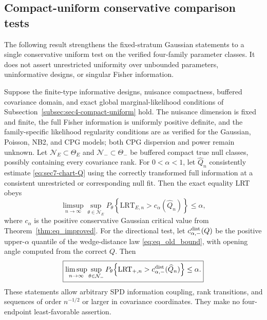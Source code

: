 \subsection{Compact-uniform conservative comparison tests}
\label{subsec:sec7-uniform-contrast}

The following result strengthens the fixed-stratum Gaussian
statements to a single conservative uniform test on the verified
four-family parameter classes. It does not assert unrestricted
uniformity over unbounded parameters, uninformative designs, or
singular Fisher information.

\begin{theorem}
\label{thm:sec7-uniform-contrasts}
Suppose the finite-type informative designs, nuisance compactness,
buffered covariance domain, and exact global marginal-likelihood
conditions of Subsection~\ref{subsec:sec4-compact-uniform} hold.
The nuisance dimension is fixed and finite, the full Fisher
information is uniformly positive definite, and the family-specific
likelihood regularity conditions are as verified for the Gaussian,
Poisson, NB2, and CPG models; both CPG dispersion and power remain
unknown. Let $\mathcal N_E\subset\Theta_E$ and
$\mathcal N_-\subset\Theta_-$ be buffered compact true null
classes, possibly containing every covariance rank. For
$0<\alpha<1$, let $\widehat Q_n$ consistently estimate
\eqref{eq:sec7-chart-Q} using the correctly transformed full
information at a consistent unrestricted or corresponding null fit.
Then the exact equality LRT obeys
\begin{equation}\label{eq:sec7-equality-uniform}
 \boxed{\displaystyle
 \limsup_{n\to\infty}\sup_{\theta\in\mathcal N_E}
 P_\theta\!\left\{\mathrm{LRT}_{E,n}>
 c_\alpha(\widehat Q_n)\right\}\le\alpha,}
\end{equation}
where $c_\alpha$ is the positive conservative Gaussian
critical value from Theorem~\ref{thm:eq_improved}.
For the directional test, let $c_{\alpha,-}^{\rm dist}(Q)$ be
the positive upper-$\alpha$ quantile of the wedge-distance law
\eqref{eq:eq_old_bound}, with opening angle computed from the
correct $Q$. Then
\begin{equation}\label{eq:sec7-directional-uniform}
 \boxed{\displaystyle
 \limsup_{n\to\infty}\sup_{\theta\in\mathcal N_-}
 P_\theta\!\left\{\mathrm{LRT}_{+,n}>
 c_{\alpha,-}^{\rm dist}(\widehat Q_n)\right\}\le\alpha.}
\end{equation}
These statements allow arbitrary SPD information coupling,
rank transitions, and sequences of order $n^{-1/2}$ or larger
in covariance coordinates. They make no four-endpoint
least-favorable assertion.
\end{theorem}

